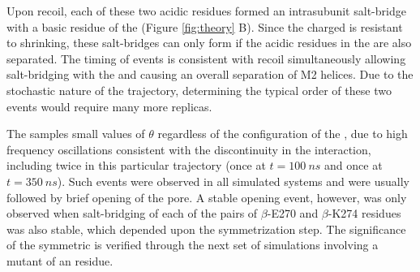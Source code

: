 \documentclass[9pt,twocolumn,twoside,lineno]{pnas-new}
\begin{document}
\begin{enumerate}
Upon recoil, each of these two acidic residues formed an intrasubunit salt-bridge with a basic residue of the \fivering (Figure \ref{fig:theory} B). Since the charged \fivering is resistant to shrinking, these salt-bridges can only form if the acidic residues in the \triad are also separated. The timing of events is consistent with \triad recoil simultaneously allowing salt-bridging with the \fivering and causing an overall separation of M2 helices. Due to the stochastic nature of the trajectory, determining the typical order of these two events would require many more replicas.
\end{enumerate}
The \triad samples small values of $\theta$ regardless of the configuration of the \fiveringnos, due to high frequency oscillations consistent with the discontinuity in the interaction, including twice in this particular trajectory (once at $t=100~ns$ and once at $t=350~ns$). Such events were observed in all simulated systems and were usually followed by brief opening of the pore. A stable opening event, however, was only observed when salt-bridging of each of the pairs of $\beta$-E270 and $\beta$-K274 residues was also stable, which depended upon the symmetrization step.  %
The significance of the symmetric \fivering is verified through the next set of simulations involving a mutant of an \fivering residue.  
\end{document}
